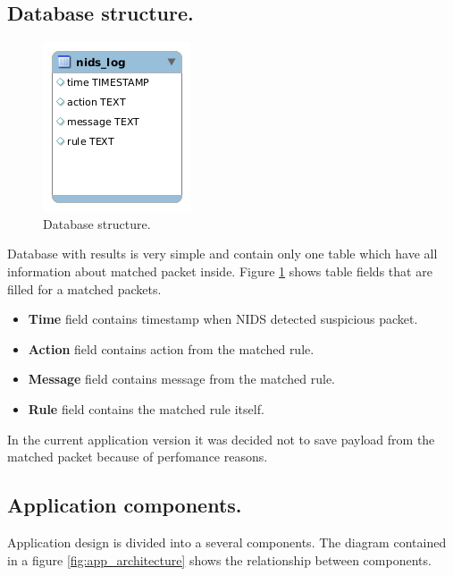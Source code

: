 \documentclass[thesis=M,english]{FITthesis}[2011/07/15]
\begin{document}
\subsection*{Database structure.}

\begin{figure}[h]
\centering
\includegraphics[scale=0.55]{images/database.png}
\caption{Database structure.}
\label{fig:database_structure}
\end{figure}

Database with results is very simple and contain only one table which have all information about matched packet inside. Figure \ref{fig:database_structure} shows table fields that are filled for a matched packets.
\begin{itemize}
\item \textbf{Time} field contains timestamp when NIDS detected suspicious packet.
\item \textbf{Action} field contains action from the matched rule.
\item \textbf{Message} field contains message from the matched rule.
\item \textbf{Rule} field contains the matched rule itself.
\end{itemize}
In the current application version it was decided not to save payload from the matched packet because of perfomance reasons.

\subsection*{Application components.}
Application design is divided into a several components. The diagram contained in a figure \ref{fig:app_architecture} shows the relationship between components.
\end{document}
